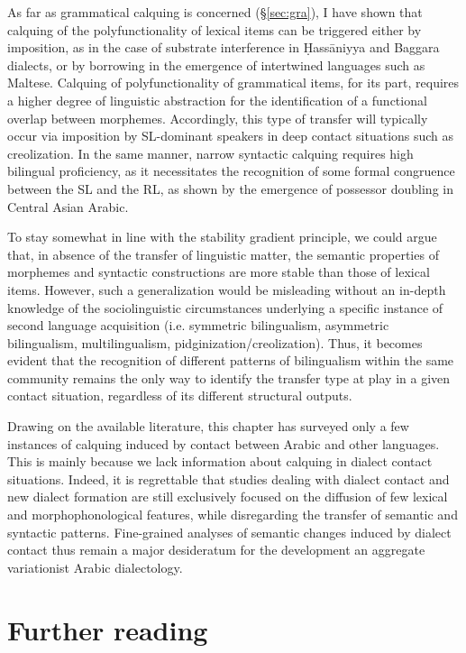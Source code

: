 \documentclass[output=paper]{langsci/langscibook}
\begin{document}
As far as grammatical calquing is concerned (§\ref{sec:gra}), I have shown that calquing of the polyfunctionality of lexical items can be triggered either by imposition, as in the case of substrate interference in Ḥass\-āniyya and Baggara dialects, or by borrowing in the emergence of intertwined languages such as Maltese. Calquing of polyfunctionality of grammatical items, for its part, requires a higher degree of linguistic abstraction for the identification of a functional overlap between morphemes. Accordingly, this type of transfer will typically occur via imposition by SL-dominant speakers in deep contact situations such as creolization. In the same manner, narrow syntactic calquing requires high bilingual proficiency, as it necessitates the recognition of some formal congruence between the SL and the RL, as shown by the emergence of possessor doubling in Central Asian Arabic.  

To stay somewhat in line with the stability gradient principle, we could argue that, in absence of the transfer of linguistic matter, the semantic properties of morphemes and syntactic constructions are more stable than those of lexical items. However, such a generalization would be misleading without an in-depth knowledge of the sociolinguistic circumstances underlying a specific instance of second language acquisition (i.e. symmetric bilingualism, asymmetric bilingualism, multilingualism, pidginization/creolization). Thus, it becomes evident that the recognition of different patterns of bilingualism within the same community remains the only way to identify the transfer type at play in a given contact situation, regardless of its different structural outputs.  

Drawing on the available literature, this chapter has surveyed only a few instances of  calquing induced by contact between Arabic and other languages. This is mainly because we lack information about calquing in dialect contact situations. Indeed, it is regrettable that studies dealing with dialect contact and new dialect formation are still exclusively focused on the diffusion of few lexical and morphophonological features, while disregarding the transfer of semantic and syntactic patterns. Fine-grained analyses of semantic changes induced by dialect contact thus remain a major desideratum for the development an aggregate variationist Arabic dialectology.  

\section*{Further reading}
\end{document}
